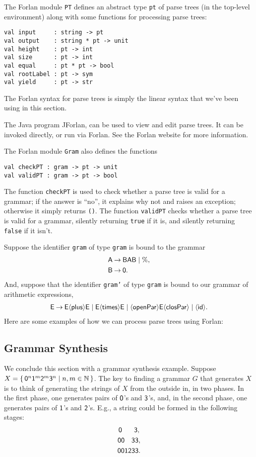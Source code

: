 The Forlan module \texttt{PT} defines an abstract type \texttt{pt} of
parse trees (in the top-level environment) along with some functions
for processing parse trees:
\begin{verbatim}
val input     : string -> pt
val output    : string * pt -> unit
val height    : pt -> int
val size      : pt -> int
val equal     : pt * pt -> bool
val rootLabel : pt -> sym
val yield     : pt -> str
\end{verbatim}
The Forlan syntax for parse trees is simply the linear syntax that
we've been using in this section.

The Java program JForlan, can be used to view and edit parse
trees.  It can be invoked directly, or run via
Forlan.  See the Forlan website for more information.

The Forlan module \texttt{Gram} also defines the functions
\begin{verbatim}
val checkPT : gram -> pt -> unit
val validPT : gram -> pt -> bool
\end{verbatim}
The function \texttt{checkPT} is used to check whether a parse tree
is valid for a grammar; if the answer is ``no'', it explains why not
and raises an exception; otherwise it simply returns \texttt{()}.
The function \texttt{validPT} checks whether a parse tree is valid
for a grammar, silently returning \texttt{true} if it is, and silently
returning \texttt{false} if it isn't.

Suppose the identifier \texttt{gram} of type \texttt{gram} is bound to the
grammar
\begin{align*}
\mathsf{A} &\mathbin{\to} \mathsf{B}\mathsf{A}\mathsf{B} \mid \% , \\
\mathsf{B} &\mathbin{\to} \mathsf{0} .
\end{align*}
And, suppose that the identifier
\texttt{gram'} of type \texttt{gram} is bound to our grammar of
arithmetic expressions,
\begin{gather*}
\mathsf{E\mathbin{\to} E{\langle\mathsf{plus}\rangle} E\mid E{\langle\mathsf{times}\rangle} E\mid {\langle\mathsf{openPar}\rangle} E{\langle\mathsf{closPar}\rangle} \mid
{\langle\mathsf{id}\rangle}} .
\end{gather*}
Here are some examples of how we can process parse trees using Forlan:


\subsection{Grammar Synthesis}

We conclude this section with a grammar synthesis example.  Suppose
$X=\{ \, \mathsf{0}^n\mathsf{1}^m\mathsf{2}^m\mathsf{3}^n \mid n,m\in\mathbb{N} \, \}$.  The key
to finding a grammar $G$ that generates $X$ is to think of generating
the strings of $X$ from the outside in, in two phases.  In the first
phase, one generates pairs of $\mathsf{0}$'s and $\mathsf{3}$'s, and, in
the second phase, one generates pairs of $\mathsf{1}$'s and $\mathsf{2}$'s.
E.g., a string could be formed in the following stages:
\begin{gather*}
{\mathsf{0\hspace{.6cm}3,}} \\
{\mathsf{00\hspace{.34cm}33,}} \\
{\mathsf{001233.}}
\end{gather*}

